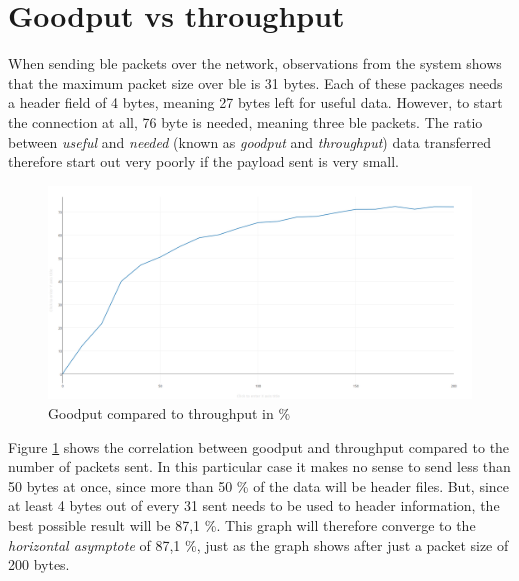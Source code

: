 \section{Goodput vs throughput}

When sending \gls{ble} packets over the network, observations from the system shows that the maximum packet size over \gls{ble} is 31 bytes. Each of these packages needs a header field of 4 bytes, meaning 27 bytes left for useful data. However, to start the connection at all, 76 byte is needed, meaning three \gls{ble} packets. The ratio between \textit{useful} and \textit{needed} (known as \textit{goodput} and \textit{throughput}) data transferred therefore start out very poorly if the payload sent is very small. 

\begin{figure}[ht]
    \centering
    \includegraphics[scale=0.25]{graph1.png}    
    \caption{Goodput compared to throughput in \%}
    \label{fig:goodputThroughputGraph}
\end{figure}


Figure \ref{fig:goodputThroughputGraph} shows the correlation between goodput and throughput compared to the number of packets sent. In this particular case it makes no sense to send less than 50 bytes at once, since more than 50 \% of the data will be header files. But, since at least 4 bytes out of every 31 sent needs to be used to header information, the best possible result will be 87,1 \%. This graph will therefore converge to the \textit{horizontal asymptote} of 87,1 \%, just as the graph shows after just a packet size of 200 bytes. 









